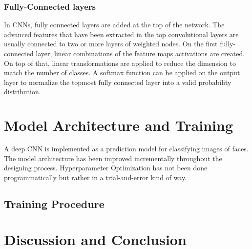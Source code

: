 \documentclass[twoside]{article}
\begin{document}
\begin{multicols}{2}
\subsubsection{Fully-Connected layers}
In CNNs, fully connected layers are added at the top of the network. The advanced features that have been extracted in the top convolutional layers are usually connected to two or more layers of weighted nodes. On the first fully-connected layer, linear combinations of the feature maps activations are created. On top of that, linear transformations are applied to reduce the dimension to match the number of classes. A softmax function can be applied on the output layer to normalize the topmost fully connected layer into a valid probability distribution.



\section{Model Architecture and Training}
A deep CNN is implemented as a prediction model for classifying images of faces. The model architecture has been improved incrementally throughout the designing process. Hyperparameter Optimization has not been done programmatically but rather in a trial-and-error kind of way.


\subsection{Training Procedure}



\section{Discussion and Conclusion}


\end{multicols}
\end{document}
